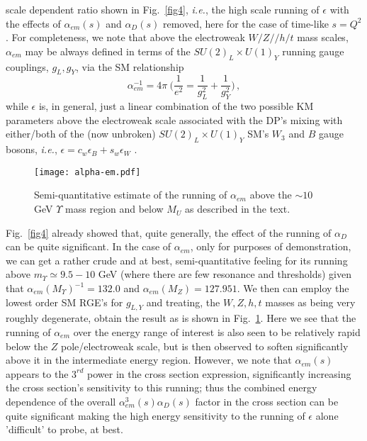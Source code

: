 \documentclass[14pt]{article}
\def\ie{{\it i.e.}}
\begin{document}
{scale dependent ratio shown in Fig.~\ref{fig4}, \ie, the high scale running of $\epsilon$ with the effects of $\alpha_{em}(s)$ and $\alpha_D(s)$ removed, here for the case of time-like $s=Q^2$. 
For completeness, we note that above the electroweak $W/Z//h/t$ mass scales, $\alpha_{em}$ may be always defined in terms of the $SU(2)_L\times U(1)_Y$ running gauge couplings, $g_L,g_Y$, 
via the SM relationship 
%
\begin{equation}
\alpha_{em}^{-1}=4\pi~\Big(\frac{1}{e^2}=\frac{1}{g_L^2}+\frac{1}{g_Y^2}\Big)\,,
\end{equation}
%
while $\epsilon$ is, in general,  just a linear combination of the two possible KM parameters above the electroweak scale associated with the DP's mixing with either/both of the (now unbroken) 
$SU(2)_L\times U(1)_Y$ SM's  $W_3$ and $B$ gauge bosons, \ie, $\epsilon=c_w\epsilon_B+s_w\epsilon_W$ \cite{Bauer:2022nwt,Rizzo:2022jti}.

%
\begin{figure}[htbp]
\centerline{\texttt{[image: alpha-em.pdf]}}
\vspace*{-1.3cm}
\caption{Semi-quantitative estimate of the running of $\alpha_{em}$ above the $\sim 10$ GeV $\Upsilon$ mass region and below $M_U$ as described in the text.}
\label{figt}
\end{figure}
%

Fig.~\ref{fig4} already showed that, quite generally, the effect of the running of $\alpha_D$ can be quite significant. In the case of $\alpha_{em}$, only for purposes of demonstration, we can get a rather 
crude and at best, semi-quantitative 
feeling for its running above $m_\Upsilon \simeq 9.5-10$ GeV (where there are few resonance and thresholds) given that $\alpha_{em}(M_\Upsilon)^{-1}=132.0$\cite{Brambilla:2007cz}  and 
$\alpha_{em}(M_Z)=127.951$\cite{PDG}. We then can employ the lowest order SM RGE's for $g_{L,Y}$ and treating, the $W,Z,h,t$ masses as being very roughly degenerate, obtain the result 
as is shown in Fig.~\ref{figt}. Here we see that the running of $\alpha_{em}$ over the energy range of interest is also seen to be relatively rapid below the $Z$ pole/electroweak scale, but is then 
observed to 
soften significantly above it in the intermediate energy region. However, we note that $\alpha_{em}(s)$ appears to the $3^{rd}$ power in the cross section expression, significantly increasing 
the cross section's sensitivity to this running; thus the combined energy dependence of the overall $\alpha_{em}^3 (s)\alpha_D(s)$ factor in the cross section can be quite significant making the 
high energy sensitivity to the running of $\epsilon$ alone 'difficult' to probe, at best.

}
\end{document}
